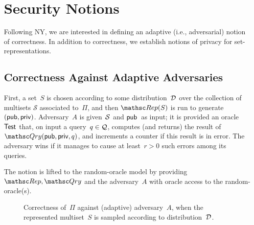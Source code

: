\section{Security Notions}
\label{sec:security-notions}
Following NY, we are interested in defining an adaptive (i.e.,
adversarial) notion of correctness.
In addition to correctness, we establish notions of privacy for
set-representations.


\subsection{Correctness Against Adaptive Adversaries}

First, a set~$S$ is chosen according to some
distribution~$\mathcal{D}_{}^{}$ over the collection of multisets
$\mathcal{S}$ associated to~$\Pi$, and then
$\Rep(S)$ is run to generate $({\sf pub},{\sf priv})$.
Adversary~$A$ is given~${\cal S}$ and ${\sf pub}$~as input; it is
provided an oracle~$\mathsf{Test}$ that, on input a query~$q \in {\cal Q}$,
computes (and returns) the result of $\Qry(\pubaux,\privaux,q)$, and increments
a counter if this result is in error.  The adversary wins if it
manages to cause at least~$r>0$ such errors among its queries.

The notion is lifted to the random-oracle model by providing
$\Rep,\Qry$ and the adversary~$A$ with oracle access to the
random-oracle(s).



\begin{figure}[htp]
\centering
{}
\caption{Correctness of~$\Pi$ against (adaptive) adversary~$A$, when
  the represented multiset~$S$ is sampled according to distribution~$\mathcal{D}_{}^{}$.}
\label{fig:correctness}
\end{figure}

